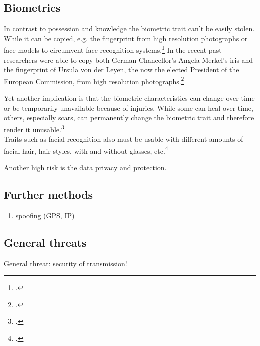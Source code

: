 \subsection{Biometrics}

In contrast to possession and knowledge the biometric trait can't be easily stolen. While it can be copied, e.g. the fingerprint from high resolution photographs or 
face models to circumvent face recognition systems.\footcites[][]{185181}[][]{220566} In the recent past researchers were able to copy both German Chancellor's Angela Merkel's iris and the fingerprint of Ursula von der Leyen, the now the elected President of the European Commission, from high resolution photographs.\footcite{ccc-merkel}

Yet another implication is that the biometric characteristics can change over time or be temporarily unavailable because of injuries. While some can heal over time, others, especially scars, can permanently change the biometric trait and therefore render it unusable.\footcite[See][52]{Jain2011}\\
Traits such as facial recognition also must be usable with different amounts of facial hair, hair styles, with and without glasses, etc.\footcite[See][98]{Jain2011}

Another high risk is the data privacy and protection.

\subsection{Further methods}

\begin{enumerate}
	\item spoofing (GPS, IP)
\end{enumerate}

\subsection{General threats}

General threat: security of transmission!